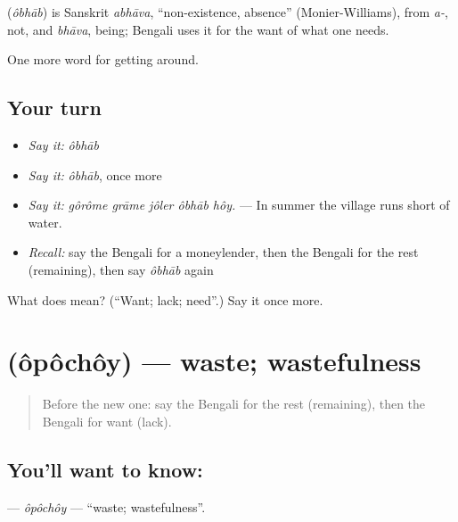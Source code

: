 \begin{cousinweb}
\textbf{} (\emph{ôbhāb}) is Sanskrit \emph{abhāva}, \textquotedblleft{}non-existence, absence\textquotedblright{} (Monier-Williams), from \emph{a-}, not, and \emph{bhāva}, being; Bengali uses it for the want of what one needs.
\end{cousinweb}

\begin{grammarlens}[title={What you've built}]
One more word for getting around.
\end{grammarlens}

\subsection*{Your turn}
\begin{itemize}
\raggedright
  \item \emph{Say it:} \emph{ôbhāb}
  \item \emph{Say it:} \emph{ôbhāb}, once more
  \item \emph{Say it:} \emph{gôrôme grāme jôler ôbhāb hôy.} — In summer the village runs short of water.
  \item \emph{Recall:} say the Bengali for a moneylender, then the Bengali for the rest (remaining), then say \emph{ôbhāb} again
\end{itemize}

\begin{tcolorbox}[breakable,colback=teal!4,colframe=teal!35!black,title={Before you move on}]
What does  mean? (\textquotedblleft{}Want; lack; need\textquotedblright{}.) Say it once more.
\end{tcolorbox}
\section[\texorpdfstring{\bn{অপচয়} (ôpôchôy)}{অপচয় (ôpôchôy)}]{ (ôpôchôy) — waste; wastefulness}

\label{lesson:BN-C419-opochoy}



\begin{quote}
Before the new one: say the Bengali for the rest (remaining), then the Bengali for want (lack).
\end{quote}

\subsection*{You'll want to know: }
\textbf{} — \emph{ôpôchôy} — \textquotedblleft{}waste; wastefulness\textquotedblright{}.


